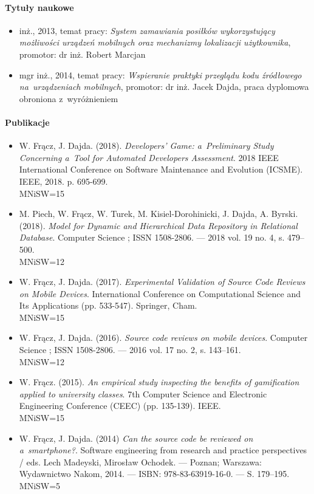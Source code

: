 \documentclass[twoside]{praca}
\begin{document}
\paragraph{Tytuły naukowe}
\begin{itemize}
\item inż., 2013, temat pracy: \textit{System zamawiania posiłków wykorzystujący możliwości urządzeń mobilnych oraz mechanizmy lokalizacji użytkownika}, promotor: dr inż. Robert Marcjan
\item mgr inż., 2014, temat pracy: \textit{Wspieranie praktyki przeglądu kodu
źródłowego na~urządzeniach mobilnych}, promotor: dr inż. Jacek Dajda, praca dyplomowa obroniona z~wyróżnieniem
\end{itemize}

\paragraph{Publikacje}
\begin{itemize}
\item W. Frącz, J. Dajda. (2018). \textit{Developers' Game: a~Preliminary Study Concerning a~Tool for Automated Developers Assessment}. 2018 IEEE International Conference on Software Maintenance and Evolution (ICSME). IEEE, 2018. p. 695-699.
\\MNiSW=15

\item M. Piech, W. Frącz, W. Turek, M. Kisiel-Dorohinicki, J. Dajda, A. Byrski. (2018). \textit{Model for Dynamic and Hierarchical Data Repository in Relational Database}. Computer Science ; ISSN 1508-2806. — 2018 vol. 19 no. 4, s. 479–500.
\\MNiSW=12

\item W. Frącz, J. Dajda. (2017). \textit{Experimental Validation of Source Code Reviews on Mobile Devices}. International Conference on Computational Science and Its Applications (pp. 533-547). Springer, Cham.
\\MNiSW=15

\item W. Frącz, J. Dajda. (2016). \textit{Source code reviews on mobile devices}. Computer Science ; ISSN 1508-2806. — 2016 vol. 17 no. 2, s. 143–161.
\\MNiSW=12

\item W. Frącz. (2015). \textit{An empirical study inspecting the benefits of gamification applied to university classes}. 7th Computer Science and Electronic Engineering Conference (CEEC) (pp. 135-139). IEEE.
\\MNiSW=15

\item W. Frącz, J. Dajda. (2014) \textit{Can the source code be reviewed on a~smartphone?}. Software engineering from research and practice perspectives / eds. Lech Madeyski, Mirosław Ochodek. — Poznan; Warszawa: Wydawnictwo Nakom, 2014. — ISBN: 978-83-63919-16-0. — S. 179–195.
\\MNiSW=5

\end{itemize}
\end{document}
